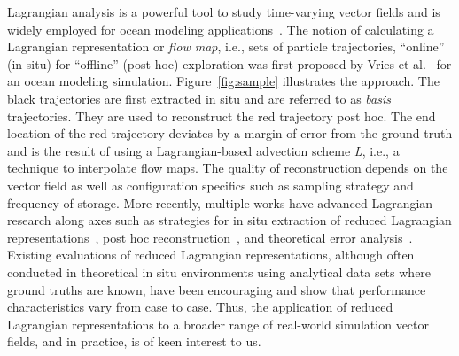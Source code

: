 %
Lagrangian analysis is a powerful tool to study time-varying vector fields and is widely employed for ocean modeling applications~\cite{VANSEBILLE201849}.
%
The notion of calculating a Lagrangian representation or \textit{flow map}, i.e., sets of particle trajectories, ``online'' (in situ) for ``offline'' (post hoc) exploration was first proposed by Vries et al.~\cite{vries2001calculating} for an ocean modeling simulation.
%
Figure~\ref{fig:sample} illustrates the approach.
%
The black trajectories are first extracted in situ and are referred to as \textit{basis} trajectories.
%
They are used to reconstruct the red trajectory post hoc.
%
The end location of the red trajectory deviates by a margin of error from the ground truth and is the result of using a Lagrangian-based advection scheme \textit{L}, i.e., a technique to interpolate flow maps.
%
The quality of reconstruction depends on the vector field as well as configuration specifics such as sampling strategy and frequency of storage. 
%
More recently, multiple works have advanced Lagrangian research along axes such as strategies for in situ extraction of reduced Lagrangian representations~\cite{agranovsky2014improved}\cite{rapp2019void}\cite{sane2020scalable}, post hoc reconstruction~\cite{chandler2015interpolation}\cite{sane2019interpolation}\cite{Jakob20}, and theoretical error analysis~\cite{bujack2015lagrangian}\cite{chandler2016analysis}\cite{hummel2016error}.
%
%
Existing evaluations of reduced Lagrangian representations, although often conducted in theoretical in situ environments using analytical data sets where ground truths are known, have been encouraging and show that performance characteristics vary from case to case. 
%
%
Thus, the application of reduced Lagrangian representations to a broader range of real-world simulation vector fields, and in practice, is of keen interest to us.

